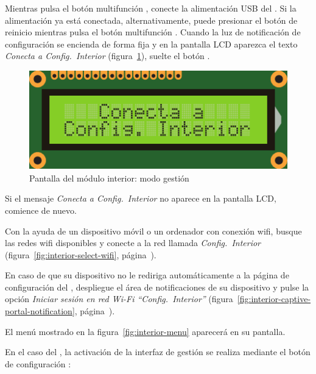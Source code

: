 \begin{enumeratecompact}

\item Mientras pulsa el botón multifunción , conecte la alimentación USB  del \MI. Si la alimentación ya está conectada, alternativamente, puede presionar el botón de reinicio  mientras pulsa el botón multifunción . Cuando la luz de notificación de configuración  se encienda de forma fija y en la pantalla LCD  aparezca el texto \emph{Conecta a Config.~Interior} (figura~\ref{fig:screen-config}), suelte el botón .

\begin{figure}[!b]
  \centering
  \includegraphics[width=0.6\columnwidth]{images/screen-config}
  \caption{Pantalla del módulo interior: modo gestión}
  \label{fig:screen-config}
\end{figure}


Si el mensaje \emph{Conecta a Config.~Interior} no aparece en la pantalla LCD, comience de nuevo.

\item Con la ayuda de un dispositivo móvil o un ordenador con conexión wifi, busque las redes wifi disponibles y conecte a la red llamada \emph{Config.~Interior} (figura~\ref{fig:interior-select-wifi}, página~\pageref{fig:interior-select-wifi}).

\item En caso de que su dispositivo no le rediriga automáticamente a la página de configuración del \MI, despliegue el área de notificaciones de su dispositivo y pulse la opción \emph{Iniciar sesión en red Wi-Fi ``Config.~Interior''} (figura~\ref{fig:interior-captive-portal-notification}, página~\pageref{fig:interior-captive-portal-notification}).

\item El menú mostrado en la figura~\ref{fig:interior-menu} aparecerá en su pantalla.

\end{enumeratecompact}

En el caso del \MEE, la activación de la interfaz de gestión se realiza mediante el botón de configuración :

